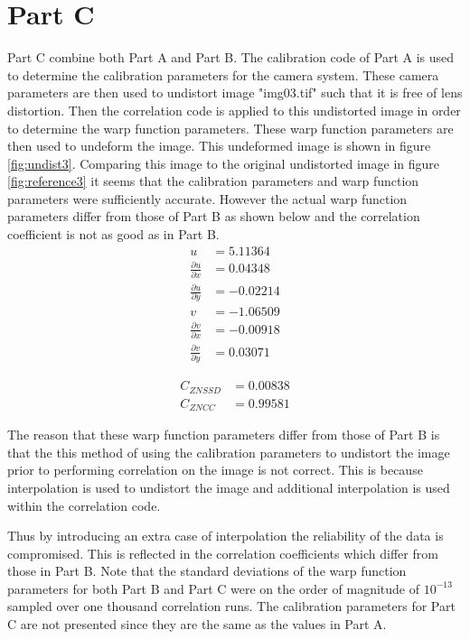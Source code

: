 \documentclass[12pt,oneside,openany,a4paper, %
english, %
masters-t, goldenblock]{usthesis}
\begin{document}
\section{Part C}
Part C combine both Part A and Part B. The calibration code of Part A is used to determine the calibration parameters for the camera system. These camera parameters are then used to undistort image "img03.tif" such that it is free of lens distortion. Then the correlation code is applied to this undistorted image in order to determine the warp function parameters. These warp function parameters are then used to undeform the image. This undeformed image is shown in figure \ref{fig:undist3}. Comparing this image to the original undistorted image in figure \ref{fig:reference3} it seems that the calibration parameters and warp function parameters were sufficiently accurate. However the actual warp function parameters differ from those of Part B as shown below and the correlation coefficient is not as good as in Part B.
\begin{align}
  u &= 5.11364\\
  \frac{\partial u}{\partial x} &= 0.04348 \\
  \frac{\partial u}{\partial y} &= -0.02214 \\
  v &= -1.06509 \\
  \frac{\partial v}{\partial x} &= -0.00918 \\
  \frac{\partial v}{\partial y} &= 0.03071
\end{align}

\begin{align}
  C_{ZNSSD} &= 0.00838 \\
  C_{ZNCC} &= 0.99581
\end{align}

The reason that these warp function parameters differ from those of Part B is that the this method of using the calibration parameters to undistort the image prior to performing correlation on the image is not correct. This is because interpolation is used to undistort the image and additional interpolation is used within the correlation code. 

Thus by introducing an extra case of interpolation the reliability of the data is compromised. This is reflected in the correlation coefficients which differ from those in Part B. Note that the standard deviations of the warp function parameters for both Part B and Part C were on the order of magnitude of $10^{-13}$ sampled over one thousand correlation runs. The calibration parameters for Part C are not presented since they are the same as the values in Part A.
\end{document}
